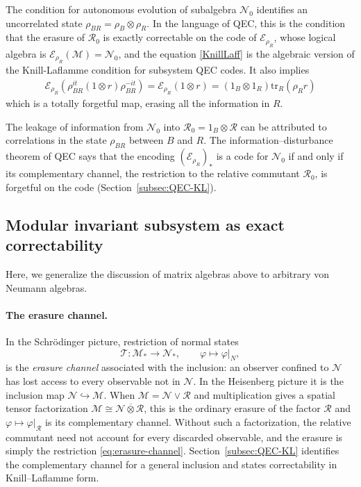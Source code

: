 \documentclass[a4paper,11pt]{article}
\theoremstyle{definition}
\newcommand{\tr}{\text{tr}}
\newcommand{\mE}{\mathcal{E}}
\begin{document}
The condition for autonomous evolution of subalgebra $\mathcal N_0$ identifies an uncorrelated state $\rho_{BR}=\rho_B\otimes \rho_R$. In the language of QEC, this is the condition that the erasure of $\mathcal R_0$ is exactly correctable on the code of $\mE_{\rho_R}$, whose logical algebra is $\mE_{\rho_R}(\mathcal M)=\mathcal N_0$, and the equation \eqref{KnillLaff} is the algebraic version of the Knill-Laflamme condition for subsystem QEC codes. It also implies
\begin{align}
    \mE_{\rho_R}(\rho_{BR}^{it}(1\otimes r)\rho_{BR}^{-it})=\mE_{\rho_R}(1\otimes r)=(1_B\otimes 1_R)\tr_R(\rho_R r)
\end{align}
which is a totally forgetful map, erasing all the information in $R$.

The leakage of information from $\mathcal N_0$ into $\mathcal R_0=1_B\otimes \mathcal R$ can be attributed to correlations in the state $\rho_{BR}$ between $B$ and $R$. The information--disturbance theorem of QEC says that the encoding $(\mE_{\rho_R})_*$ is a code for $\mathcal N_0$ if and only if its complementary channel, the restriction to the relative commutant $\mathcal R_0$, is forgetful on the code (Section~\ref{subsec:QEC-KL}).



\subsection{Modular invariant subsystem as exact correctability}\label{subsec:QEC-takesaki}

Here, we generalize the discussion of matrix algebras above to arbitrary von Neumann algebras.

\paragraph{The erasure channel.}
In the Schr\"odinger picture, restriction of normal states
\begin{equation}
 \mathcal T:\mathcal M_*\to\mathcal N_*,\qquad \varphi\mapsto\varphi|_N,
 \label{eq:erasure-channel}
\end{equation}
is the \emph{erasure channel} associated with the inclusion: an observer confined to $\mathcal N$ has lost access to every observable not in $\mathcal N$. In the Heisenberg picture it is the inclusion map $\mathcal N\hookrightarrow\mathcal M$. When $\mathcal M=\mathcal N\vee\mathcal R$ and multiplication gives a spatial tensor factorization $\mathcal M\cong\mathcal N\overline\otimes\mathcal R$, this is the ordinary erasure of the factor $\mathcal R$ and $\varphi\mapsto\varphi|_{\mathcal R}$ is its complementary channel. Without such a factorization, the relative commutant need not account for every discarded observable, and the erasure is simply the restriction \eqref{eq:erasure-channel}. Section~\ref{subsec:QEC-KL} identifies the complementary channel for a general inclusion and states correctability in Knill--Laflamme form.
\end{document}
